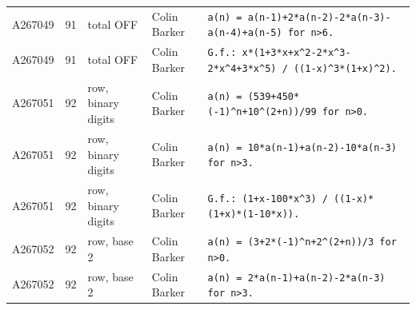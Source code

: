 \documentclass[11pt]{article}
\theoremstyle{definition}
\theoremstyle{remark}
\begin{document}
{\begin{longtable}{p{1.3cm}p{0.7cm}p{2.4cm}p{2.3cm}p{7.3cm}}
A267049 & 91 & total OFF & Colin Barker & \texttt{a(n)\allowbreak{} \allowbreak{}=\allowbreak{} \allowbreak{}a(n-\allowbreak{}1)\allowbreak{}+\allowbreak{}2*\allowbreak{}a(n-\allowbreak{}2)\allowbreak{}-\allowbreak{}2*\allowbreak{}a(n-\allowbreak{}3)\allowbreak{}-\allowbreak{}a(n-\allowbreak{}4)\allowbreak{}+\allowbreak{}a(n-\allowbreak{}5)\allowbreak{} \allowbreak{}for \allowbreak{}n>6.} \\
A267049 & 91 & total OFF & Colin Barker & \texttt{G.f.: \allowbreak{}x*\allowbreak{}(1+\allowbreak{}3*\allowbreak{}x+\allowbreak{}x\^{}2-\allowbreak{}2*\allowbreak{}x\^{}3-\allowbreak{}2*\allowbreak{}x\^{}4+\allowbreak{}3*\allowbreak{}x\^{}5)\allowbreak{} \allowbreak{}/\allowbreak{} \allowbreak{}((1-\allowbreak{}x)\allowbreak{}\^{}3*\allowbreak{}(1+\allowbreak{}x)\allowbreak{}\^{}2)\allowbreak{}.} \\
A267051 & 92 & row, binary digits & Colin Barker & \texttt{a(n)\allowbreak{} \allowbreak{}=\allowbreak{} \allowbreak{}(539+\allowbreak{}450*\allowbreak{}(-\allowbreak{}1)\allowbreak{}\^{}n+\allowbreak{}10\^{}(2+\allowbreak{}n)\allowbreak{})\allowbreak{}/\allowbreak{}99 \allowbreak{}for \allowbreak{}n>0.} \\
A267051 & 92 & row, binary digits & Colin Barker & \texttt{a(n)\allowbreak{} \allowbreak{}=\allowbreak{} \allowbreak{}10*\allowbreak{}a(n-\allowbreak{}1)\allowbreak{}+\allowbreak{}a(n-\allowbreak{}2)\allowbreak{}-\allowbreak{}10*\allowbreak{}a(n-\allowbreak{}3)\allowbreak{} \allowbreak{}for \allowbreak{}n>3.} \\
A267051 & 92 & row, binary digits & Colin Barker & \texttt{G.f.: \allowbreak{}(1+\allowbreak{}x-\allowbreak{}100*\allowbreak{}x\^{}3)\allowbreak{} \allowbreak{}/\allowbreak{} \allowbreak{}((1-\allowbreak{}x)\allowbreak{}*\allowbreak{}(1+\allowbreak{}x)\allowbreak{}*\allowbreak{}(1-\allowbreak{}10*\allowbreak{}x)\allowbreak{})\allowbreak{}.} \\
A267052 & 92 & row, base 2 & Colin Barker & \texttt{a(n)\allowbreak{} \allowbreak{}=\allowbreak{} \allowbreak{}(3+\allowbreak{}2*\allowbreak{}(-\allowbreak{}1)\allowbreak{}\^{}n+\allowbreak{}2\^{}(2+\allowbreak{}n)\allowbreak{})\allowbreak{}/\allowbreak{}3 \allowbreak{}for \allowbreak{}n>0.} \\
A267052 & 92 & row, base 2 & Colin Barker & \texttt{a(n)\allowbreak{} \allowbreak{}=\allowbreak{} \allowbreak{}2*\allowbreak{}a(n-\allowbreak{}1)\allowbreak{}+\allowbreak{}a(n-\allowbreak{}2)\allowbreak{}-\allowbreak{}2*\allowbreak{}a(n-\allowbreak{}3)\allowbreak{} \allowbreak{}for \allowbreak{}n>3.} \\

\end{longtable}}
\end{document}
